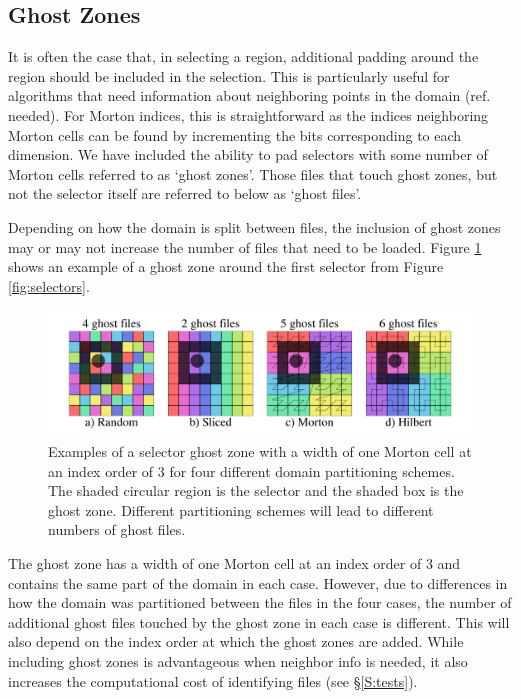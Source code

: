 \documentclass[apjl]{emulateapj}
\newcommand{\todo}[1]{{\color{red}{#1}}}
\newcommand{\addref}{{\color{red}(ref. needed)}}
\begin{document}
\subsection{Ghost Zones}
It is often the case that, in selecting a region, additional padding around the region should be included in the selection. This is particularly useful for algorithms that need information about neighboring points in the domain \addref. For Morton indices, this is straightforward as the indices neighboring Morton cells can be found by incrementing the bits corresponding to each dimension. We have included the ability to pad selectors with some number of Morton cells referred to as `ghost zones'. Those files that touch ghost zones, but not the selector itself are referred to below as `ghost files'. 

Depending on how the domain is split between files, the inclusion of ghost zones may or may not increase the number of files that need to be loaded. Figure \ref{fig:ghosts} shows an example of a ghost zone around the first selector from Figure \ref{fig:selectors}. 
%
\begin{figure}[htbp]
\begin{center}
\includegraphics[width=\columnwidth,keepaspectratio]{../images/ghosts.png}
\caption{Examples of a selector ghost zone with a width of one Morton cell at an index order of 3 for  four different domain partitioning schemes. The shaded circular region is the selector and the shaded box is the ghost zone. Different partitioning schemes will lead to different numbers of ghost files.}
\label{fig:ghosts}
\end{center}
\end{figure}
%
The ghost zone has a width of one Morton cell at an index order of 3 and contains the same part of the domain in each case. However, due to differences in how the domain was partitioned between the files in the four cases, the number of additional ghost files touched by the ghost zone in each case is different. This will also depend on the index order at which the ghost zones are added. \todo{(more?)} While including ghost zones is advantageous when neighbor info is needed, it also increases the computational cost of identifying files (see \S\ref{S:tests}). 
\end{document}
